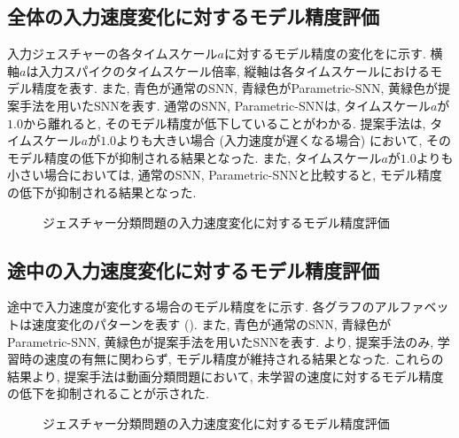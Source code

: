 \subsection{全体の入力速度変化に対するモデル精度評価}
入力ジェスチャーの各タイムスケール$a$に対するモデル精度の変化をに示す.
横軸$a$は入力スパイクのタイムスケール倍率, 縦軸は各タイムスケールにおけるモデル精度を表す.
また, 青色が通常のSNN, 青緑色がParametric-SNN, 黄緑色が提案手法を用いたSNNを表す.
通常のSNN, Parametric-SNNは, タイムスケール$a$が$1.0$から離れると, そのモデル精度が低下していることがわかる.
提案手法は, タイムスケール$a$が$1.0$よりも大きい場合 (入力速度が遅くなる場合) において, そのモデル精度の低下が抑制される結果となった.
また, タイムスケール$a$が$1.0$よりも小さい場合においては, 通常のSNN, Parametric-SNNと比較すると, モデル精度の低下が抑制される結果となった.
\begin{figure}[htb]
    \centering
    
    \caption{ジェスチャー分類問題の入力速度変化に対するモデル精度評価}
    \label{fig:result2:eval1}
\end{figure}


\subsection{途中の入力速度変化に対するモデル精度評価}
途中で入力速度が変化する場合のモデル精度をに示す.
各グラフのアルファベットは速度変化のパターンを表す ().
また, 青色が通常のSNN, 青緑色がParametric-SNN, 黄緑色が提案手法を用いたSNNを表す.
より, 提案手法のみ, 学習時の速度の有無に関わらず, モデル精度が維持される結果となった.
これらの結果より, 提案手法は動画分類問題において, 未学習の速度に対するモデル精度の低下を抑制されることが示された.
\begin{figure}[htb]
    \centering
    
    \caption{ジェスチャー分類問題の入力速度変化に対するモデル精度評価}
    \label{fig:result2:eval2}
\end{figure}


